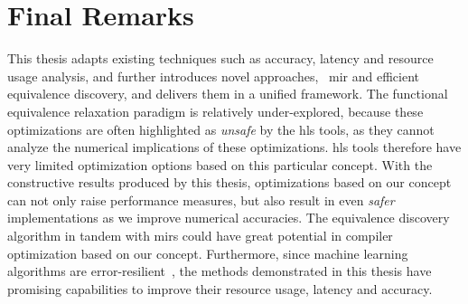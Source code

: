 



\section{Final Remarks}
\label{cc:sec:final_remarks}

This thesis adapts existing techniques such as accuracy, latency and resource
usage analysis, and further introduces novel approaches, \eg~\gls{mir} and
efficient equivalence discovery, and delivers them in a unified framework.
The functional equivalence relaxation paradigm is relatively under-explored,
because these optimizations are often highlighted as \emph{unsafe} by the
\gls{hls} tools, as they cannot analyze the numerical implications of these
optimizations.  \Gls{hls} tools therefore have very limited optimization
options based on this particular concept.  With the constructive results
produced by this thesis, optimizations based on our concept can not only raise
performance measures, but also result in even \emph{safer} implementations
as we improve numerical accuracies.  The equivalence discovery algorithm in
tandem with \glspl{mir} could have great potential in compiler optimization
based on our concept.  Furthermore, since machine learning algorithms are
error-resilient~\cite{lesser11, kim09, holt91, zhu03}, the methods demonstrated
in this thesis have promising capabilities to improve their resource usage,
latency and accuracy.
